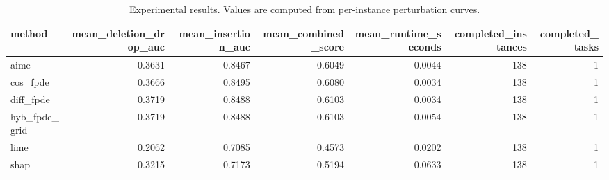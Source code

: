 \begin{table}[t]
\caption{Experimental results. Values are computed from per-instance perturbation curves.}
\label{tab:main_results_computed}
\centering
\begin{tabular}{lrrrrrr}
\toprule
method & mean\_deletion\_drop\_auc & mean\_insertion\_auc & mean\_combined\_score & mean\_runtime\_seconds & completed\_instances & completed\_tasks \\
\midrule
aime & 0.3631 & 0.8467 & 0.6049 & 0.0044 & 138 & 1 \\
cos\_fpde & 0.3666 & 0.8495 & 0.6080 & 0.0034 & 138 & 1 \\
diff\_fpde & 0.3719 & 0.8488 & 0.6103 & 0.0034 & 138 & 1 \\
hyb\_fpde\_grid & 0.3719 & 0.8488 & 0.6103 & 0.0054 & 138 & 1 \\
lime & 0.2062 & 0.7085 & 0.4573 & 0.0202 & 138 & 1 \\
shap & 0.3215 & 0.7173 & 0.5194 & 0.0633 & 138 & 1 \\
\bottomrule
\end{tabular}

\end{table}
